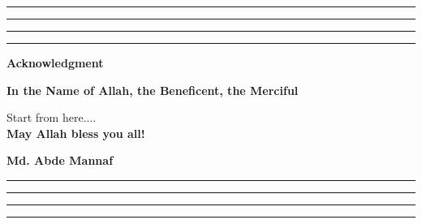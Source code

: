 \thispagestyle{empty}
\hrule\hrule\hrule\hrule %

\begin{center}
\textbf{\large Acknowledgment}
\end{center}
\begin{center}
    {\bf In the Name of Allah, the Beneficent, the Merciful}
\end{center}
Start from here....\\
{\bf May Allah bless you all!}

 

\begin{flushright} 
{\bf Md. Abde Mannaf}
\end{flushright}
\vfill
\hrule\hrule\hrule\hrule
\clearpage